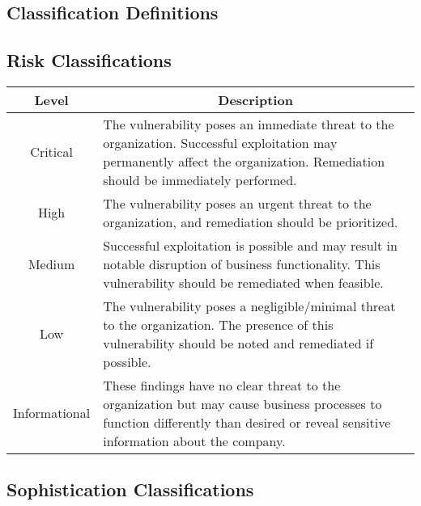 \newpage
\begin{fullwidth} %
\section{Classification Definitions}

\subsection*{Risk Classifications}

\begin{table}[htp]
\centering
\begin{tabular}{|c|p{5.35in}|}
\hline
\rowcolor[HTML]{C0C0C0} 
\textbf{Level} &
  \multicolumn{1}{c|}{\cellcolor[HTML]{C0C0C0}\textbf{Description}} \\ \hline
\cellcolor[HTML]{\critColor}Critical &
  The vulnerability poses an immediate threat to the organization. Successful exploitation may permanently affect the organization. Remediation should be immediately performed. \\ \hline
\cellcolor[HTML]{\highColor}High &
  The vulnerability poses an urgent threat to the organization, and remediation should be prioritized. \\ \hline
\cellcolor[HTML]{\medColor}Medium &
  Successful exploitation is possible and may result in notable disruption of business functionality. This vulnerability should be remediated when feasible. \\ \hline
\cellcolor[HTML]{\lowColor}Low &
  The vulnerability poses a negligible/minimal threat to the organization. The presence of this vulnerability should be noted and remediated if possible. \\ \hline
\cellcolor[HTML]{\infoColor}Informational &
  These findings have no clear threat to the organization but may cause business processes to function differently than desired or reveal sensitive information about the company. \\ \hline
\end{tabular}
\end{table}

\subsection*{Sophistication Classifications}


\end{fullwidth}
